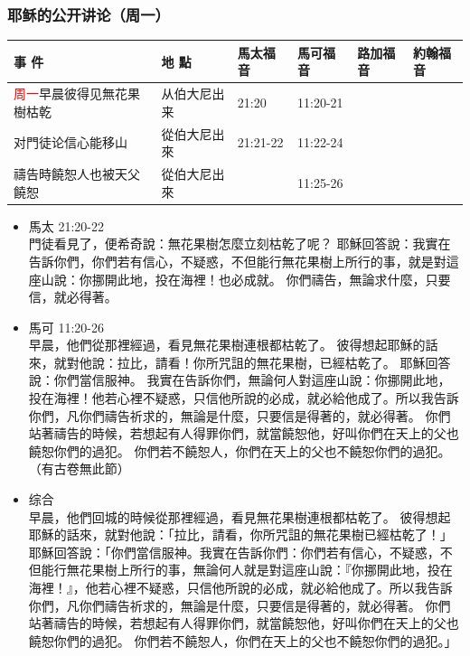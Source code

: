 \subsubsection{耶稣的公开讲论（周一）}

\begin{table}[H]\centering
\begin{tabular}{p{14em}|p{7.93em}|l|l|l|p{4.855em}} \toprule
\textbf{事 件} & \textbf{地 點} & \multicolumn{1}{p{5.285em}|}{\textbf{馬太福音}} & \multicolumn{1}{p{5.57em}|}{\textbf{馬可福音}} & \multicolumn{1}{p{5.285em}|}{\textbf{路加福音}} & \textbf{約翰福音} \\  \midrule
\textcolor{red}{周一}早晨彼得见無花果樹枯乾&从伯大尼出来&21:20& 11:20-21&&  \\\midrule
对門徒论信心能移山&從伯大尼出來& 21:21-22&11:22-24&&  \\\midrule
禱告時饒恕人也被天父饒恕&從伯大尼出來& &11:25-26&&  \\\midrule
\end{tabular}%
\end{table}

\begin{itemize}
\item 馬太 21:20-22\\
門徒看見了，便希奇說：無花果樹怎麼立刻枯乾了呢？
耶穌回答說：我實在告訴你們，你們若有信心，不疑惑，不但能行無花果樹上所行的事，就是對這座山說：你挪開此地，投在海裡！也必成就。
你們禱告，無論求什麼，只要信，就必得著。
\item 馬可 11:20-26\\
早晨，他們從那裡經過，看見無花果樹連根都枯乾了。
彼得想起耶穌的話來，就對他說：拉比，請看！你所咒詛的無花果樹，已經枯乾了。
耶穌回答說：你們當信服神。
我實在告訴你們，無論何人對這座山說：你挪開此地，投在海裡！他若心裡不疑惑，只信他所說的必成，就必給他成了。所以我告訴你們，凡你們禱告祈求的，無論是什麼，只要信是得著的，就必得著。
你們站著禱告的時候，若想起有人得罪你們，就當饒恕他，好叫你們在天上的父也饒恕你們的過犯。
你們若不饒恕人，你們在天上的父也不饒恕你們的過犯。（有古卷無此節）
\item 综合\\
早晨，他們回城的時候從那裡經過，看見無花果樹連根都枯乾了。 彼得想起耶穌的話來，就對他說：「拉比，請看，你所咒詛的無花果樹已經枯乾了！」耶穌回答說：「你們當信服神。我實在告訴你們：你們若有信心，不疑惑，不但能行無花果樹上所行的事，無論何人就是對這座山說：『你挪開此地，投在海裡！』，他若心裡不疑惑，只信他所說的必成，就必給他成了。所以我告訴你們，凡你們禱告祈求的，無論是什麼，只要信是得著的，就必得著。 你們站著禱告的時候，若想起有人得罪你們，就當饒恕他，好叫你們在天上的父也饒恕你們的過犯。 你們若不饒恕人，你們在天上的父也不饒恕你們的過犯。」
\end{itemize}


